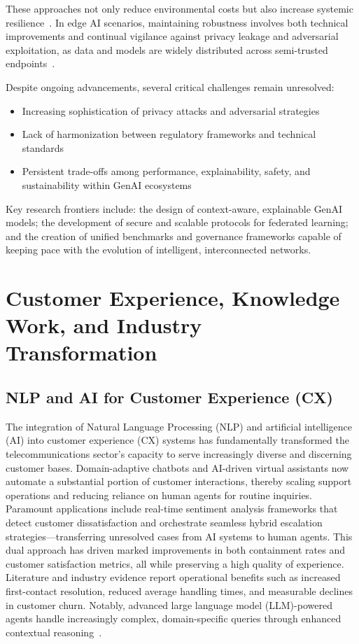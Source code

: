 \documentclass[sigconf]{acmart}
\begin{document}
These approaches not only reduce environmental costs but also increase systemic resilience~\cite{ref7,ref26}. In edge AI scenarios, maintaining robustness involves both technical improvements and continual vigilance against privacy leakage and adversarial exploitation, as data and models are widely distributed across semi-trusted endpoints~\cite{ref48,ref49}.

Despite ongoing advancements, several critical challenges remain unresolved:

\begin{itemize}
    \item Increasing sophistication of privacy attacks and adversarial strategies
    \item Lack of harmonization between regulatory frameworks and technical standards
    \item Persistent trade-offs among performance, explainability, safety, and sustainability within GenAI ecosystems
\end{itemize}

Key research frontiers include: the design of context-aware, explainable GenAI models; the development of secure and scalable protocols for federated learning; and the creation of unified benchmarks and governance frameworks capable of keeping pace with the evolution of intelligent, interconnected networks.

\section{Customer Experience, Knowledge Work, and Industry Transformation}

\subsection{NLP and AI for Customer Experience (CX)}

The integration of Natural Language Processing (NLP) and artificial intelligence (AI) into customer experience (CX) systems has fundamentally transformed the telecommunications sector’s capacity to serve increasingly diverse and discerning customer bases. Domain-adaptive chatbots and AI-driven virtual assistants now automate a substantial portion of customer interactions, thereby scaling support operations and reducing reliance on human agents for routine inquiries. Paramount applications include real-time sentiment analysis frameworks that detect customer dissatisfaction and orchestrate seamless hybrid escalation strategies—transferring unresolved cases from AI systems to human agents. This dual approach has driven marked improvements in both containment rates and customer satisfaction metrics, all while preserving a high quality of experience. Literature and industry evidence report operational benefits such as increased first-contact resolution, reduced average handling times, and measurable declines in customer churn. Notably, advanced large language model (LLM)-powered agents handle increasingly complex, domain-specific queries through enhanced contextual reasoning~\cite{ref18}.
\end{document}
